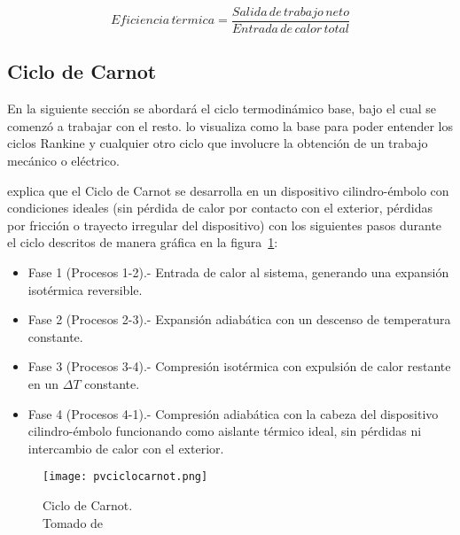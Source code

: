 \begin{equation}
    Eficiencia\, t \acute{e}rmica=\frac{Salida\,de\,trabajo\,neto}{Entrada\,de\,calor\,total}
\end{equation}

\subsection{Ciclo de Carnot}

En la siguiente sección se abordará el ciclo termodinámico base, bajo el cual se comenzó a trabajar con el resto. \textcite{burghardt1984ingenieria} lo visualiza como la base para poder entender los ciclos Rankine y cualquier otro ciclo que involucre la obtención de un trabajo mecánico o eléctrico. 


\textcite{rajput2009engineering} explica que el Ciclo de Carnot se desarrolla en un dispositivo cilindro-émbolo con condiciones ideales (sin pérdida de calor por contacto con el exterior, pérdidas por fricción o trayecto irregular del dispositivo) con los siguientes pasos durante el ciclo descritos de manera gráfica en la figura~\ref{fig:ciclocarnot1}:

\begin{itemize}
    \item Fase 1 (Procesos 1-2).- Entrada de calor al sistema, generando una expansión isotérmica reversible.
    \item Fase 2 (Procesos 2-3).- Expansión adiabática con un descenso de temperatura constante.
    \item Fase 3 (Procesos 3-4).- Compresión isotérmica con expulsión de calor restante en un \( \Delta T \) constante.
    \item Fase 4 (Procesos 4-1).- Compresión adiabática con la cabeza del dispositivo cilindro-émbolo funcionando como aislante térmico ideal, sin pérdidas ni intercambio de calor con el exterior.
\end{itemize}

\begin{figure}[H]
    \centering
    \texttt{[image: pvciclocarnot.png]}
    \caption{Ciclo de Carnot. \\ Tomado de \textcite{shapirotermo}}
    \label{fig:ciclocarnot1}
\end{figure}

